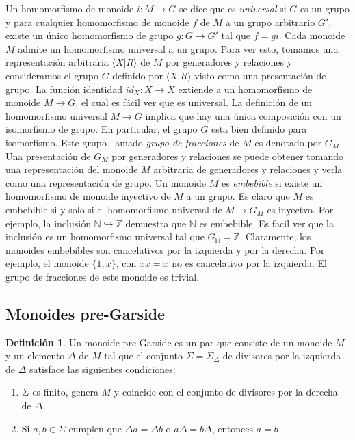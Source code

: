\documentclass[12pt]{article}
\theoremstyle{definition}
\newtheorem{defi}{Definición}[section]
\begin{document}
Un homomorfismo de monoide $i:M\rightarrow G$ se dice que es \textit{universal} si $G$ es un grupo y para cualquier homomorfismo de monoide $f$ de $M$ a un grupo arbitrario $G'$, existe un único homomorfismo de grupo $g:G\rightarrow G'$ tal que $f=gi$. Cada monoide $M$ admite un homomorfismo universal a un grupo. Para ver esto, tomamos una representación arbitraria $\langle X | R \rangle$ de $M$ por generadores y relaciones y consideramos el grupo $G$ definido por $\langle X | R \rangle$ visto como una presentación de grupo. La función identidad $id_X:X\rightarrow X$ extiende a un homomorfismo de monoide $M\rightarrow G$, el cual es fácil ver que es universal. La definición de un homomorfismo universal $M\rightarrow G$ implica que hay una única composición con un isomorfismo de grupo. En particular, el grupo $G$ esta bien definido para isomorfismo. Este grupo llamado \textit{grupo de fracciones} de $M$ es denotado por $G_M$. Una presentación de $G_M$ por generadores y relaciones se puede obtener tomando una representación del monoide $M$ arbitraria de generadores y relaciones y verla como una representación de grupo.
\newline
\newline
Un monoide $M$ es \textit{embebible} si existe un homomorfismo de monoide inyectivo de $M$ a un grupo. Es claro que $M$ es embebible si y solo si el homomorfismo universal de $M\rightarrow G_M$ es inyectvo. Por ejemplo, la inclusión $\mathbb{N}\hookrightarrow\mathbb{Z}$ demuestra que $\mathbb{N}$ es embebible. Es facil ver que la inclusión es un homomorfismo universal tal que $G_\mathbb{N}=\mathbb{Z}$.
\newline
\newline
Claramente, los monoides embebibles son cancelativos por la izquierda y por la derecha. Por ejemplo, el monoide $\{1,x\}$, con $xx=x$ no es cancelativo por la izquierda. El grupo de fracciones de este monoide es trivial.

\subsection{Monoides pre-Garside}

\begin{defi}
Un monoide pre-Garside es un par que consiste de un monoide $M$ y un elemento $\Delta$ de $M$ tal que el conjunto $\Sigma=\Sigma_\Delta$ de divisores por la izquierda de $\Delta$ satisface las siguientes condiciones:

\begin{enumerate}
\item $\Sigma$ es finito, genera $M$ y  coincide con el conjunto de divisores por la derecha de $\Delta$.
\item Si $a,b\in\Sigma$ cumplen que $\Delta a=\Delta b$ o $a\Delta=b\Delta$, entonces $a=b$
\end{enumerate}
\label{defi:pre-garside}
\end{defi}
\end{document}
